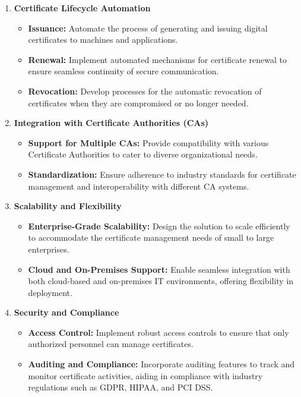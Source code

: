 \documentclass[10pt]{report}
\begin{document}
\begin{enumerate}[{label=\arabic*.]
    \item \textbf{Certificate Lifecycle Automation}
    \begin{itemize}
        \item \textbf{Issuance:} Automate the process of generating and issuing digital certificates to machines and applications.
        \item \textbf{Renewal:} Implement automated mechanisms for certificate renewal to ensure seamless continuity of secure communication.
        \item \textbf{Revocation:} Develop processes for the automatic revocation of certificates when they are compromised or no longer needed.
    \end{itemize}
    \item \textbf{Integration with Certificate Authorities (CAs)}
    \begin{itemize}
        \item \textbf{Support for Multiple CAs:} Provide compatibility with various Certificate Authorities to cater to diverse organizational needs.
        \item \textbf{Standardization:} Ensure adherence to industry standards for certificate management and interoperability with different CA systems.
    \end{itemize}
    \item \textbf{Scalability and Flexibility}
    \begin{itemize}
        \item \textbf{Enterprise-Grade Scalability:} Design the solution to scale efficiently to accommodate the certificate management needs of small to large enterprises.
        \item \textbf{Cloud and On-Premises Support:} Enable seamless integration with both cloud-based and on-premises IT environments, offering flexibility in deployment.
    \end{itemize}
    \item \textbf{Security and Compliance}
    \begin{itemize}
        \item \textbf{Access Control:} Implement robust access controls to ensure that only authorized personnel can manage certificates.
        \item \textbf{Auditing and Compliance:} Incorporate auditing features to track and monitor certificate activities, aiding in compliance with industry regulations such as GDPR, HIPAA, and PCI DSS.
    \end{itemize}
    

\end{enumerate}
\end{document}
